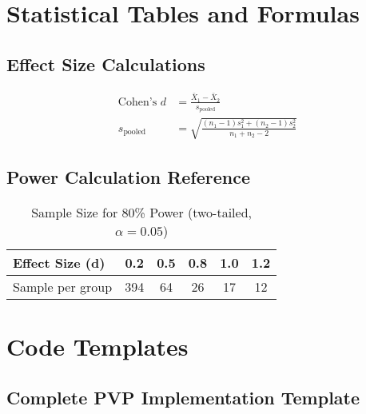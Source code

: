\documentclass[12pt,oneside]{memoir}
\theoremstyle{plain}
\theoremstyle{definition}
\theoremstyle{remark}
\begin{document}
\backmatter

\appendix

\chapter{Statistical Tables and Formulas}

\section{Effect Size Calculations}

\begin{align}
\text{Cohen's } d &= \frac{\bar{X}_1 - \bar{X}_2}{s_{\text{pooled}}} \\
s_{\text{pooled}} &= \sqrt{\frac{(n_1-1)s_1^2 + (n_2-1)s_2^2}{n_1+n_2-2}}
\end{align}

\section{Power Calculation Reference}

\begin{table}[h]
\centering
\caption{Sample Size for 80\% Power (two-tailed, $\alpha=0.05$)}
\begin{tabular}{lccccc}
\toprule
\textbf{Effect Size (d)} & 0.2 & 0.5 & 0.8 & 1.0 & 1.2 \\
\midrule
Sample per group & 394 & 64 & 26 & 17 & 12 \\
\bottomrule
\end{tabular}
\end{table}

\chapter{Code Templates}

\section{Complete PVP Implementation Template}
\end{document}
